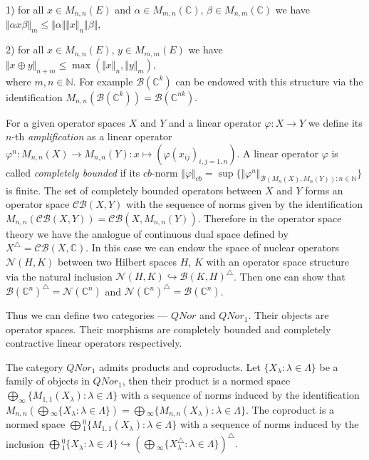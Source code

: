 \documentclass[a0b,landscape]{a0poster}
\begin{document}
\begin{multicols}{4}
1) for all $x\in M_{n,n}(E)$ and $\alpha\in M_{m,n}(\mathbb{C})$, $\beta\in M_{n,m}(\mathbb{C})$ we have
$
\Vert\alpha x\beta\Vert_m\leq\Vert\alpha\Vert\Vert x\Vert_n\Vert\beta\Vert,
$

2) for all $x\in M_{n,n}(E)$, $y\in M_{m,m}(E)$ we have
$
\Vert x\oplus y\Vert_{n+m}\leq\max(\Vert x\Vert_n,\Vert y\Vert_m),
$\\
where $m,n\in\mathbb{N}$. For example $\mathcal{B}(\mathbb{C}^k)$ can be endowed with this structure via the identification 
$M_{n,n}(\mathcal{B}(\mathbb{C}^k))=\mathcal{B}(\mathbb{C}^{nk})$.

For a given operator spaces $X$ and $Y$ and a linear operator $\varphi:X\to Y$ we define its $n$-th \textit{amplification} as a linear operator
$\varphi^n:M_{n,n}(X)\to M_{n,n}(Y):x\mapsto (\varphi(x_{ij})_{i,j=1,n})$. A linear operator $\varphi$ is called \textit{completely bounded} if its $cb$-norm
$\Vert \varphi\Vert_{cb}=\sup\{\Vert \varphi^n\Vert_{\mathcal{B}(M_n(X),M_n(Y)):n\in\mathbb{N}}\}$ is finite. 
The set of completely bounded operators between $X$ and $Y$ forms an operator space
$\mathcal{CB}(X,Y)$ with the sequence of norms given by the identification $M_{n,n}(\mathcal{CB}(X,Y))=\mathcal{CB}(X,M_{n,n}(Y))$.
Therefore in the operator space theory we have the analogue of
continuous dual space defined by $X^\triangle=\mathcal{CB}(X,\mathbb{C})$. In this case we can endow the space of nuclear operators $\mathcal{N}(H,K)$ between two Hilbert 
spaces $H$, $K$ with an operator space structure via the natural inclusion $\mathcal{N}(H,K)\hookrightarrow \mathcal{B}(K,H)^\triangle$. Then one can show that
$\mathcal{B}(\mathbb{C}^n)^\triangle=\mathcal{N}(\mathbb{C}^n)$ and $\mathcal{N}(\mathbb{C}^n)^\triangle=\mathcal{B}(\mathbb{C}^n)$.

Thus we can define two categories --- $QNor$ and $QNor_1$. Their objects are operator spaces. Their morphisms are completely bounded and completely contractive linear 
operators respectively.

The category $QNor_1$ admits products and coproducts. Let $\{X_ \lambda : \lambda \in \Lambda\}$ be a family of objects in $QNor_1$, then their product is a normed space
$\bigoplus_\infty\{M_{1,1}(X_ \lambda ): \lambda \in \Lambda\}$ with a sequence of norms induced by the identification 
$M_{n,n}\left(\bigoplus{}_\infty\{X_ \lambda : \lambda  \in \Lambda\}\right)=\bigoplus{}_\infty\{M_{n,n}(X_ \lambda ): \lambda \in \Lambda\}$. 
The coproduct is a normed space $\bigoplus{}_1^0\{M_{1,1}(X_ \lambda ): \lambda \in \Lambda\}$ with a sequence of norms induced by the inclusion
$\bigoplus{}_1^0\{X_ \lambda : \lambda  \in \Lambda\}\hookrightarrow\left(\bigoplus{}_\infty\{X_ \lambda ^\triangle: \lambda \in \Lambda\}\right)^\triangle.$


\end{multicols}
\end{document}
